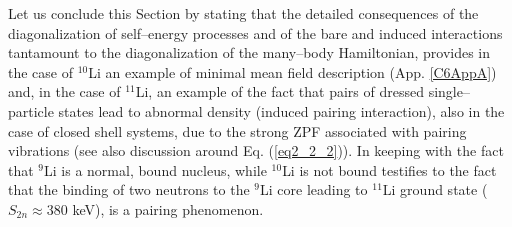  
 Let us conclude this Section by stating that the detailed consequences  of the diagonalization of self--energy processes and of the bare and induced interactions  tantamount to the diagonalization of the many--body Hamiltonian, provides in the case of $^{10}$Li an example of minimal mean field description  (App. \ref{C6AppA}) and, in the case of $^{11}$Li, an example of the fact that pairs of dressed single--particle states lead to abnormal density (induced pairing interaction), also in the case of closed shell systems, due to the strong ZPF associated with pairing vibrations (see also discussion around Eq. (\ref{eq2_2_2})). In keeping with the fact that $^9$Li is a normal, bound nucleus, while $^{10}$Li is not bound testifies to the fact that the binding of two neutrons to the $^9$Li core leading to $^{11}$Li ground state ($S_{2n}\approx 380$ keV), is a pairing phenomenon. 
